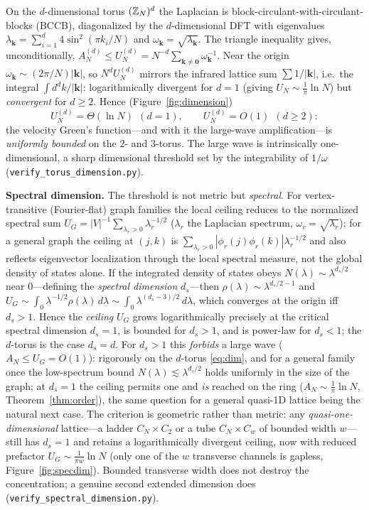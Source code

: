 On the $d$-dimensional torus $(\mathbb{Z}_N)^d$ the Laplacian is block-circulant-with-circulant-blocks (BCCB),
diagonalized by the $d$-dimensional DFT with eigenvalues
$\lambda_{\mathbf k}=\sum_{i=1}^d4\sin^2(\pi k_i/N)$ and $\omega_{\mathbf k}=\sqrt{\lambda_{\mathbf k}}$.
The triangle inequality gives, unconditionally,
$A_N^{(d)}\le U_N^{(d)}=N^{-d}\sum_{\mathbf k\ne\mathbf0}\omega_{\mathbf k}^{-1}$. Near the origin
$\omega_{\mathbf k}\sim(2\pi/N)|\mathbf k|$, so $N^d U_N^{(d)}$ mirrors the infrared lattice sum
$\sum 1/|\mathbf k|$, i.e.\ the integral $\int d^dk/|\mathbf k|$: logarithmically divergent for $d=1$
(giving $U_N\sim\frac1\pi\ln N$) but \emph{convergent} for $d\ge2$. Hence (Figure~\ref{fig:dimension})
\begin{equation}\label{eq:dim}
  U_N^{(d)}=\Theta(\ln N)\ \ (d=1),\qquad U_N^{(d)}=O(1)\ \ (d\ge2):
\end{equation}
the velocity Green's function---and with it the large-wave amplification---is \emph{uniformly bounded}
on the $2$- and $3$-torus. The large wave is intrinsically one-dimensional, a sharp dimensional
threshold set by the integrability of $1/\omega$ (\texttt{verify\_torus\_dimension.py}).

\medskip\noindent\textbf{Spectral dimension.} The threshold is not metric but \emph{spectral}. For
vertex-transitive (Fourier-flat) graph families the local ceiling reduces to the normalized spectral sum
$U_G=|V|^{-1}\sum_{\lambda_r>0}\lambda_r^{-1/2}$ ($\lambda_r$ the Laplacian spectrum,
$\omega_r=\sqrt{\lambda_r}$); for a general graph the ceiling at $(j,k)$ is
$\sum_{\lambda_r>0}|\phi_r(j)\phi_r(k)|\lambda_r^{-1/2}$ and also reflects eigenvector localization through
the local spectral measure, not the global density of states alone.
If the integrated density of states obeys $N(\lambda)\sim\lambda^{d_s/2}$ near $0$---defining the
\emph{spectral dimension} $d_s$---then $\rho(\lambda)\sim\lambda^{d_s/2-1}$ and
$U_G\sim\int_0\lambda^{-1/2}\rho(\lambda)\,d\lambda\sim\int_0\lambda^{(d_s-3)/2}\,d\lambda$, which
converges at the origin iff $d_s>1$. Hence the \emph{ceiling} $U_G$ grows logarithmically precisely at
the critical spectral dimension $d_s=1$, is bounded for $d_s>1$, and is power-law for $d_s<1$; the
$d$-torus is the case $d_s=d$. For $d_s>1$ this \emph{forbids} a large wave ($A_N\le U_G=O(1)$):
rigorously on the $d$-torus \eqref{eq:dim}, and for a general family once the low-spectrum bound
$N(\lambda)\lesssim\lambda^{d_s/2}$ holds uniformly in the size of the graph; at $d_s=1$ the ceiling permits one and \emph{is} reached on the ring
($A_N\sim\tfrac1\pi\ln N$, Theorem~\ref{thm:order}), the same question for a general quasi-1D lattice being
the natural next case. The criterion is geometric rather than metric: any
\emph{quasi-one-dimensional} lattice---a ladder $C_N\times C_2$ or a tube $C_N\times C_w$ of bounded
width $w$---still has $d_s=1$ and retains a logarithmically divergent ceiling, now with reduced prefactor
$U_G\sim\tfrac1{\pi w}\ln N$ (only one of the $w$ transverse channels is gapless, Figure~\ref{fig:specdim}).
Bounded transverse width does not destroy the concentration; a genuine second extended dimension does
(\texttt{verify\_spectral\_dimension.py}).

